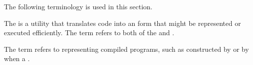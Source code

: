 
%
%   
%
%




 
The following terminology is used in this section.
 
The  is a utility that translates code into an
 form that might be represented or
executed efficiently.
The term  refers to both of the 
 and .

The term  refers to 
 representing compiled programs, such as  constructed
by  or by  when  a .

